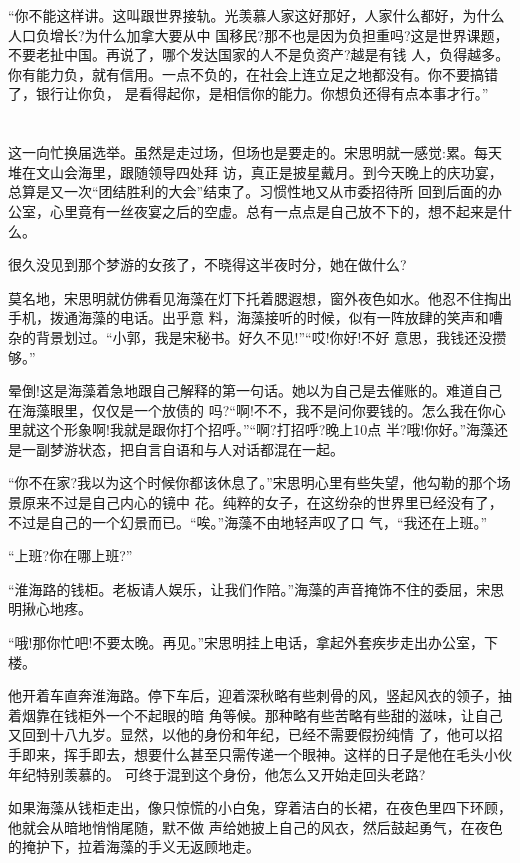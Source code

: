 \documentclass[11pt,a4paper,onecolumn]{article}
\begin{document}
``你不能这样讲。这叫跟世界接轨。光羡慕人家这好那好，人家什么都好，为什么人口负增长?为什么加拿大要从中
国移民?那不也是因为负担重吗?这是世界课题，不要老扯中国。再说了，哪个发达国家的人不是负资产?越是有钱
人，负得越多。你有能力负，就有信用。一点不负的，在社会上连立足之地都没有。你不要搞错了，银行让你负，
是看得起你，是相信你的能力。你想负还得有点本事才行。''

\section[\thesection]{}

这一向忙换届选举。虽然是走过场，但场也是要走的。宋思明就一感觉:累。每天堆在文山会海里，跟随领导四处拜
访，真正是披星戴月。到今天晚上的庆功宴，总算是又一次``团结胜利的大会''结束了。习惯性地又从市委招待所
回到后面的办公室，心里竟有一丝夜宴之后的空虚。总有一点点是自己放不下的，想不起来是什么。

很久没见到那个梦游的女孩了，不晓得这半夜时分，她在做什么?

莫名地，宋思明就仿佛看见海藻在灯下托着腮遐想，窗外夜色如水。他忍不住掏出手机，拨通海藻的电话。出乎意
料，海藻接听的时候，似有一阵放肆的笑声和嘈杂的背景划过。``小郭，我是宋秘书。好久不见!''``哎!你好!不好
意思，我钱还没攒够。''

晕倒!这是海藻着急地跟自己解释的第一句话。她以为自己是去催账的。难道自己在海藻眼里，仅仅是一个放债的
吗?``啊!不不，我不是问你要钱的。怎么我在你心里就这个形象啊!我就是跟你打个招呼。''``啊?打招呼?晚上10点
半?哦!你好。''海藻还是一副梦游状态，把自言自语和与人对话都混在一起。

``你不在家?我以为这个时候你都该休息了。''宋思明心里有些失望，他勾勒的那个场景原来不过是自己内心的镜中
花。纯粹的女子，在这纷杂的世界里已经没有了，不过是自己的一个幻景而已。``唉。''海藻不由地轻声叹了口
气，``我还在上班。''

``上班?你在哪上班?''

``淮海路的钱柜。老板请人娱乐，让我们作陪。''海藻的声音掩饰不住的委屈，宋思明揪心地疼。

``哦!那你忙吧!不要太晚。再见。''宋思明挂上电话，拿起外套疾步走出办公室，下楼。

他开着车直奔淮海路。停下车后，迎着深秋略有些刺骨的风，竖起风衣的领子，抽着烟靠在钱柜外一个不起眼的暗
角等候。那种略有些苦略有些甜的滋味，让自己又回到十八九岁。显然，以他的身份和年纪，已经不需要假扮纯情
了，他可以招手即来，挥手即去，想要什么甚至只需传递一个眼神。这样的日子是他在毛头小伙年纪特别羡慕的。
可终于混到这个身份，他怎么又开始走回头老路?

如果海藻从钱柜走出，像只惊慌的小白兔，穿着洁白的长裙，在夜色里四下环顾，他就会从暗地悄悄尾随，默不做
声给她披上自己的风衣，然后鼓起勇气，在夜色的掩护下，拉着海藻的手义无返顾地走。
\end{document}
